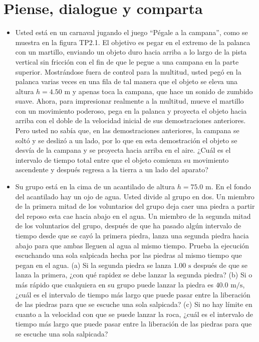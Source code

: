 \documentclass[11pt,a4paper]{article}
\begin{document}
\section*{Piense, dialogue y comparta}

\begin{itemize}
    \item[\textbf{1.}] Usted está en un carnaval jugando el juego ``Pégale a la campana'', como se muestra en la figura TP2.1. El objetivo es pegar en el extremo de la palanca con un martillo, enviando un objeto duro hacia arriba a lo largo de la pista vertical sin fricción con el fin de que le pegue a una campana en la parte superior. Mostrándose fuera de control para la multitud, usted pegó en la palanca varias veces en una fila de tal manera que el objeto se eleva una altura $h = 4.50 \text{ m}$ y apenas toca la campana, que hace un sonido de zumbido suave. Ahora, para impresionar realmente a la multitud, mueve el martillo con un movimiento poderoso, pega en la palanca y proyecta el objeto hacia arriba con el doble de la velocidad inicial de sus demostraciones anteriores. Pero usted no sabía que, en las demostraciones anteriores, la campana se soltó y se deslizó a un lado, por lo que en esta demostración el objeto se desvía de la campana y se proyecta hacia arriba en el aire. ¿Cuál es el intervalo de tiempo total entre que el objeto comienza su movimiento ascendente y después regresa a la tierra a un lado del aparato?
    \vspace*{9cm}

    \item[\textbf{2.}] Su grupo está en la cima de un acantilado de altura $h = 75.0 \text{ m}$. En el fondo del acantilado hay un ojo de agua. Usted divide al grupo en dos. Un miembro de la primera mitad de los voluntarios del grupo deja caer una piedra a partir del reposo esta cae hacia abajo en el agua. Un miembro de la segunda mitad de los voluntarios del grupo, después de que ha pasado algún intervalo de tiempo desde que se cayó la primera piedra, lanza una segunda piedra hacia abajo para que ambas lleguen al agua al mismo tiempo. Prueba la ejecución escuchando una sola salpicada hecha por las piedras al mismo tiempo que pegan en el agua. (a) Si la segunda piedra se lanza $1.00 \text{ s}$ después de que se lanza la primera, ¿con qué rapidez se debe lanzar la segunda piedra? (b) Si o más rápido que cualquiera en su grupo puede lanzar la piedra es $40.0 \text{ m/s}$, ¿cuál es el intervalo de tiempo más largo que puede pasar entre la liberación de las piedras para que se escuche una sola salpicada? (c) Si no hay límite en cuanto a la velocidad con que se puede lanzar la roca, ¿cuál es el intervalo de tiempo más largo que puede pasar entre la liberación de las piedras para que se escuche una sola salpicada?
    \vspace*{12cm}


\end{itemize}
\end{document}
